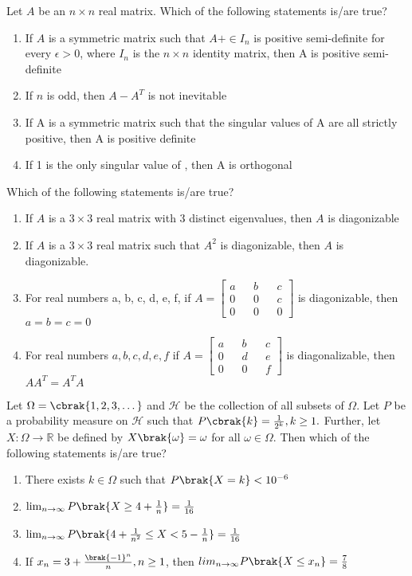 \item Let $A$ be an $n \times n $ real matrix. Which of the following statements is/are true?
\begin{enumerate}
\item If $A$ is a symmetric matrix such that $A + \in I_{n}$ is positive semi-definite for every $\epsilon > 0$, where $I_{n}$ is the $n \times n $  identity matrix, then A is positive semi-definite
\item If $n$ is odd, then $A - A^{T}$ is not inevitable
\item If A is a symmetric matrix such that the singular values of A are all strictly positive, then A is positive definite
\item If 1 is the only singular value of , then A is orthogonal
\end{enumerate}

\item Which of the following statements is/are true?
\begin{enumerate}
\item If $A$ is a $ 3 \times 3 $ real matrix with 3 distinct eigenvalues, then $A$ is diagonizable 
\item If $A$ is a $3 \times 3$ real matrix such that $A^{2}$ is diagonizable, then $A$ is diagonizable.
\item For real numbers a, b, c, d, e, f, if $A = \begin{bmatrix} a && b && c \\ 0 && 0 && c \\ 0 && 0 && 0 \end{bmatrix}$  is diagonizable, then $a=b=c=0$
\item For real numbers $a, b, c, d, e, f$ if $A= \begin{bmatrix} a && b && c \\ 0 && d && e \\ 0 && 0 && f \end{bmatrix}$ is diagonalizable, then $AA^{T} = A^{T}A$
\end{enumerate}

\item Let $\Omega = \cbrak{1, 2, 3, \dots }$ and $\mathcal{H}$ be the collection of all subsets of $\Omega$. Let $P$ be a probability measure on $\mathcal{H}$ such that $P\cbrak{k} = \frac{1}{2^{k}}, k \geq 1.$ Further, let $X: \Omega \rightarrow \mathbb{R}$ be defined by $X\brak{\omega} = \omega $ for all $\omega \in \Omega $. Then which of the following statements is/are true?
\begin{enumerate}
\item There exists $k \in \Omega $ such that $P\brak{X = k} < 10^{-6}$
\item $\lim_{n \to \infty} P\brak{X \geq 4 + \frac{1}{n}} = \frac{1}{16}$
\item $\lim_{n \to \infty} P\brak{ 4 + \frac{1}{n^{2}} \leq X < 5 - \frac{1}{n} }= \frac{1}{16}$
\item If $x_{n} = 3 + \frac{ \brak{-1}^{n}}{n}, n \geq 1$, then $lim_{n \to \infty}P\brak{X \leq x_{n} } = \frac{7}{8}$
\end{enumerate}


